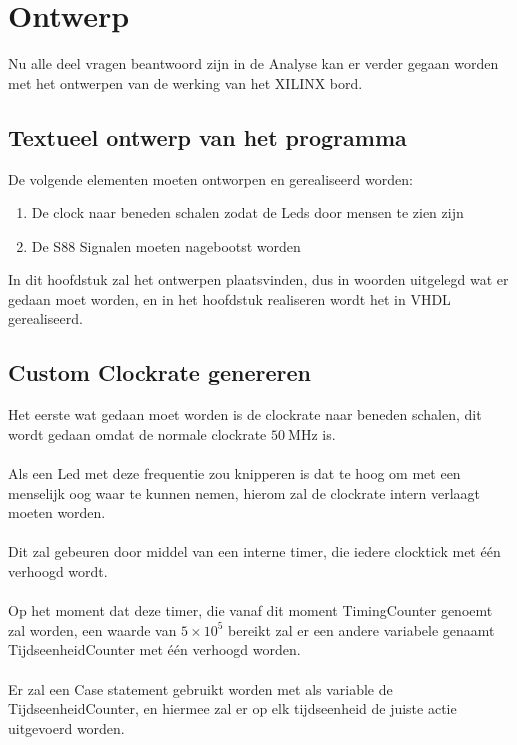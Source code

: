 \chapter{Ontwerp}

Nu alle deel vragen beantwoord zijn in de Analyse kan er verder gegaan worden met het ontwerpen van de werking van het XILINX bord.

\section{Textueel ontwerp van het programma}

De volgende elementen moeten ontworpen en gerealiseerd worden:
\begin{enumerate}
	\item De clock naar beneden schalen zodat de Leds door mensen te zien zijn
	\item De S88 Signalen moeten nagebootst worden
\end{enumerate}

In dit hoofdstuk zal het ontwerpen plaatsvinden, dus in woorden uitgelegd wat er gedaan moet worden, en in het hoofdstuk realiseren wordt het in VHDL gerealiseerd.

\clearpage
\section{Custom Clockrate genereren}

Het eerste wat gedaan moet worden is de clockrate naar beneden schalen, dit wordt gedaan omdat de normale clockrate $\SI{50}{\mega\hertz} $ is.
\\\\
Als een Led met deze frequentie zou knipperen is dat te hoog om met een menselijk oog waar te kunnen nemen, hierom zal de clockrate intern verlaagt moeten worden.
\\\\
Dit zal gebeuren door middel van een interne timer, die iedere clocktick met één verhoogd wordt.
\\\\
Op het moment dat deze timer, die vanaf dit moment TimingCounter genoemt zal worden, een waarde van ${5} \times {10}^5$ bereikt zal er een andere variabele genaamt TijdseenheidCounter met \'e\'en verhoogd worden. 
\\\\
Er zal een Case statement gebruikt worden met als variable de TijdseenheidCounter, en hiermee zal er op elk tijdseenheid de juiste actie uitgevoerd worden.
\clearpage
